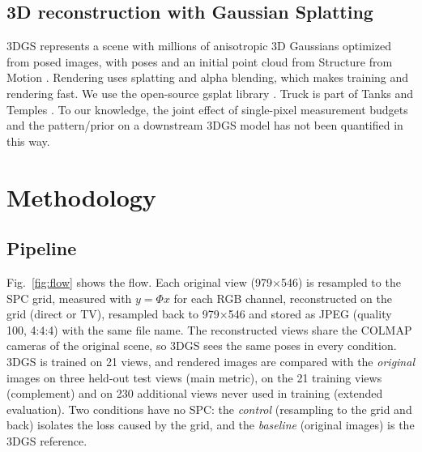 \documentclass[conference]{IEEEtran}
\begin{document}
\subsection{3D reconstruction with Gaussian Splatting}
3DGS \cite{kerbl2023} represents a scene with millions of anisotropic 3D Gaussians optimized from posed images, with poses
and an initial point cloud from Structure from Motion \cite{schonberger2016}. Rendering uses splatting
\cite{zwicker2001} and alpha blending, which makes training and rendering fast. We use the open-source gsplat library
\cite{ye2024gsplat}. Truck is part of Tanks and Temples \cite{knapitsch2017}. To our knowledge, the joint effect of
single-pixel measurement budgets and the pattern/prior on a downstream 3DGS model has not been quantified in this way.

\section{Methodology}
\subsection{Pipeline}
Fig.~\ref{fig:flow} shows the flow. Each original view (979$\times$546) is resampled to the SPC grid, measured with
$y=\Phi x$ for each RGB channel, reconstructed on the grid (direct or TV), resampled back to 979$\times$546 and stored as
JPEG (quality 100, 4:4:4) with the same file name. The reconstructed views share the COLMAP cameras of the original
scene, so 3DGS sees the same poses in every condition. 3DGS is trained on 21 views, and rendered images are compared with
the \emph{original} images on three held-out test views (main metric), on the 21 training views (complement) and on 230
additional views never used in training (extended evaluation). Two conditions have no SPC: the \emph{control}
(resampling to the grid and back) isolates the loss caused by the grid, and the \emph{baseline} (original images) is the
3DGS reference.
\end{document}
